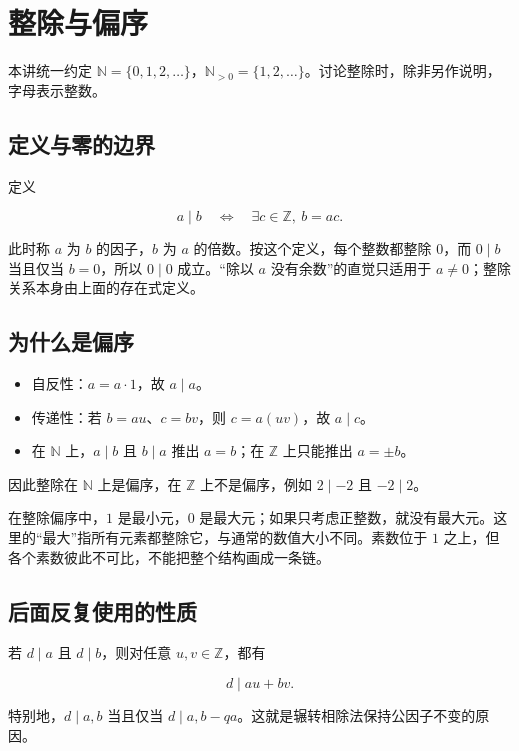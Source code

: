 \section{整除与偏序}


本讲统一约定 $\mathbb N=\{0,1,2,\ldots\}$，$\mathbb N_{>0}=\{1,2,\ldots\}$。讨论整除时，除非另作说明，字母表示整数。

\subsection{定义与零的边界}


定义

\[
a\mid b\quad\Longleftrightarrow\quad \exists c\in\mathbb Z,\ b=ac.
\]

此时称 $a$ 为 $b$ 的因子，$b$ 为 $a$ 的倍数。按这个定义，每个整数都整除 $0$，而 $0\mid b$ 当且仅当 $b=0$，所以 $0\mid0$ 成立。“除以 $a$ 没有余数”的直觉只适用于 $a\ne0$；整除关系本身由上面的存在式定义。

\subsection{为什么是偏序}


\begin{itemize}
\item 自反性：$a=a\cdot1$，故 $a\mid a$。
\item 传递性：若 $b=au$、$c=bv$，则 $c=a(uv)$，故 $a\mid c$。
\item 在 $\mathbb N$ 上，$a\mid b$ 且 $b\mid a$ 推出 $a=b$；在 $\mathbb Z$ 上只能推出 $a=\pm b$。
\end{itemize}


因此整除在 $\mathbb N$ 上是偏序，在 $\mathbb Z$ 上不是偏序，例如 $2\mid-2$ 且 $-2\mid2$。

在整除偏序中，$1$ 是最小元，$0$ 是最大元；如果只考虑正整数，就没有最大元。这里的“最大”指所有元素都整除它，与通常的数值大小不同。素数位于 $1$ 之上，但各个素数彼此不可比，不能把整个结构画成一条链。

\subsection{后面反复使用的性质}


若 $d\mid a$ 且 $d\mid b$，则对任意 $u,v\in\mathbb Z$，都有

\[
d\mid au+bv.
\]

特别地，$d\mid a,b$ 当且仅当 $d\mid a,b-qa$。这就是辗转相除法保持公因子不变的原因。
